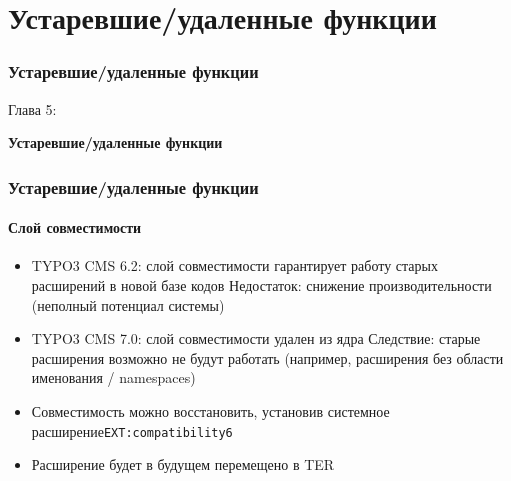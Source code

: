 %

\section{Устаревшие/удаленные функции}
\begin{frame}[fragile]
	\frametitle{Устаревшие/удаленные функции}

	\begin{center}\huge{Глава 5:}\end{center}
	\begin{center}\huge{\color{typo3darkgrey}\textbf{Устаревшие/удаленные функции}}\end{center}

\end{frame}


\begin{frame}[fragile]
	\frametitle{Устаревшие/удаленные функции}
	\framesubtitle{Слой совместимости}

	\begin{itemize}

		\item TYPO3 CMS 6.2: слой совместимости гарантирует работу старых расширений в новой базе кодов\newline
			\small
				Недостаток: снижение производительности (неполный потенциал системы)
			\normalsize

		\item TYPO3 CMS 7.0: слой совместимости удален из ядра\newline
			\small
				Следствие: старые расширения возможно не будут работать (например, расширения без области именования / namespaces)
			\normalsize

		\item Совместимость можно восстановить, установив системное расширение\texttt{EXT:compatibility6}
		\item Расширение будет в будущем перемещено в TER

	\end{itemize}

\end{frame}

